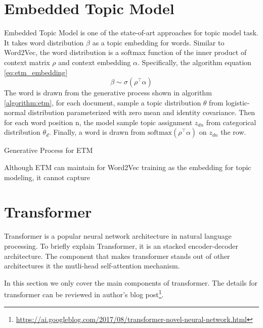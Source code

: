 \section{Embedded Topic Model} \label{ch2:etm}
Embedded Topic Model \cite{dieng_topic_2019} is one of the state-of-art approaches for topic model task. It takes word distribution $ \beta $ as a topic embedding for words. %
Similar to Word2Vec\cite{mikolov_distributed_nodate}, the word distribution is a softmax function of the inner product of context matrix $ \rho $ and context embedding $ \alpha $. Specifically, the algorithm   equation \ref{eq:etm_embedding}
\begin{equation}\label{eq:etm_embedding}
\beta\sim\sigma(\rho^\top\alpha)
\end{equation}
The word is drawn from the generative process shown in algorithm \ref{algorithm:etm}, for each document, sample a topic distribution $ \theta $ from logistic-normal distribution parameterized with zero mean and identity covariance. Then for each word position n, the model sample topic assignment $ z_{dn} $ from categorical distribution $ \theta_d $. Finally, a word is drawn from $ \text{softmax}(\rho^\top\alpha) $ on $ z_{dn} $ the row.\\
\begin{algorithm}[H]\label{algorithm:etm}
\caption{Generative Process for ETM}
\end{algorithm}
Although ETM can maintain for Word2Vec training as the embedding for topic modeling, it cannot capture 
\section{Transformer} \label{ch2:transformer}
Transformer\cite{vaswani_attention_nodate} is a popular neural network architecture in natural language processing. To briefly explain Transformer, it is an stacked encoder-decoder architecture. The component that makes transformer stands out of other architectures it the mutli-head self-attention mechanism. 

In this section we only cover the main components of transformer. The details for transformer can be reviewed in author's blog post\footnote{\url{https://ai.googleblog.com/2017/08/transformer-novel-neural-network.html}}.

